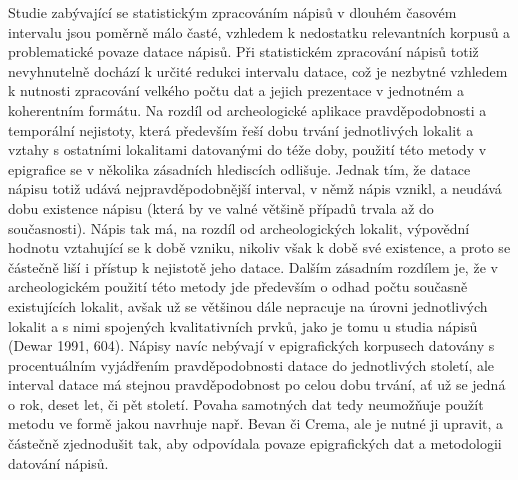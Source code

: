 Studie zabývající se statistickým zpracováním nápisů v dlouhém časovém intervalu jsou poměrně málo časté, vzhledem k nedostatku relevantních korpusů a problematické povaze datace nápisů. Při statistickém zpracování nápisů totiž nevyhnutelně dochází k určité redukci intervalu datace, což je nezbytné vzhledem k nutnosti zpracování velkého počtu dat a jejich prezentace v jednotném a koherentním formátu. Na rozdíl od archeologické aplikace pravděpodobnosti a temporální nejistoty, která především řeší dobu trvání jednotlivých lokalit a vztahy s ostatními lokalitami datovanými do téže doby, použití této metody v epigrafice se v několika zásadních hlediscích odlišuje. Jednak tím, že datace nápisu totiž udává nejpravděpodobnější interval, v němž nápis vznikl, a neudává dobu existence nápisu (která by ve valné většině případů trvala až do současnosti). Nápis tak má, na rozdíl od archeologických lokalit, výpovědní hodnotu vztahující se k době vzniku, nikoliv však k době své existence, a proto se částečně liší i přístup k nejistotě jeho datace. Dalším zásadním rozdílem je, že v archeologickém použití této metody jde především o odhad počtu současně existujících lokalit, avšak už se většinou dále nepracuje na úrovni jednotlivých lokalit a s nimi spojených kvalitativních prvků, jako je tomu u studia nápisů (Dewar 1991, 604). Nápisy navíc nebývají v epigrafických korpusech datovány s procentuálním vyjádřením pravděpodobnosti datace do jednotlivých století, ale interval datace má stejnou pravděpodobnost po celou dobu trvání, ať už se jedná o rok, deset let, či pět století. Povaha samotných dat tedy neumožňuje použít metodu ve formě jakou navrhuje např. Bevan či Crema, ale je nutné ji upravit, a částečně zjednodušit tak, aby odpovídala povaze epigrafických dat a metodologii datování nápisů.

